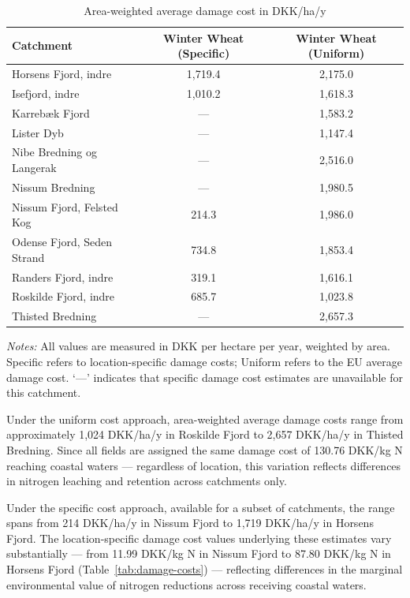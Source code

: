 \documentclass[12pt]{article}
\begin{document}
\begin{table}[H]
\centering
\small
\caption{Area-weighted average damage cost in DKK/ha/y }
\label{tab:damage_costs_all}
\begin{tabular}{lcc}
\toprule
\textbf{Catchment} & \textbf{Winter Wheat (Specific)} & \textbf{Winter Wheat (Uniform)} \\
\midrule
Horsens Fjord, indre          & 1,719.4 & 2,175.0 \\
Isefjord, indre               & 1,010.2 & 1,618.3 \\
Karrebæk Fjord                & ---     & 1,583.2 \\
Lister Dyb                    & ---     & 1,147.4 \\
Nibe Bredning og Langerak     & ---     & 2,516.0 \\
Nissum Bredning               & ---     & 1,980.5 \\
Nissum Fjord, Felsted Kog     & 214.3   & 1,986.0 \\
Odense Fjord, Seden Strand    & 734.8   & 1,853.4 \\
Randers Fjord, indre          & 319.1   & 1,616.1 \\
Roskilde Fjord, indre         & 685.7   & 1,023.8 \\
Thisted Bredning              & ---     & 2,657.3 \\
\bottomrule
\end{tabular}
\begin{tablenotes}
\footnotesize
\item \textit{Notes:} All values are measured in DKK per hectare per year, weighted by 
area. Specific refers to location-specific damage costs; Uniform refers to the EU 
average damage cost. `---' indicates that specific damage cost estimates are 
unavailable for this catchment.
\end{tablenotes}
\end{table}


Under the uniform cost approach, area-weighted average damage costs range from approximately 1,024 DKK/ha/y in Roskilde Fjord to 2,657 DKK/ha/y in Thisted Bredning. Since all fields are assigned the same damage cost of 130.76 DKK/kg N reaching coastal waters --- regardless of location, this variation reflects differences in nitrogen leaching and retention across catchments only.

Under the specific cost approach, available for a subset of catchments, the range 
spans from 214 DKK/ha/y in Nissum Fjord to 1,719 DKK/ha/y in Horsens Fjord. The 
location-specific damage cost values underlying these estimates vary substantially 
--- from 11.99 DKK/kg N in Nissum Fjord to 87.80 DKK/kg N in Horsens Fjord 
(Table~\ref{tab:damage-costs}) --- reflecting differences in the marginal 
environmental value of nitrogen reductions across receiving coastal waters.
\end{document}
